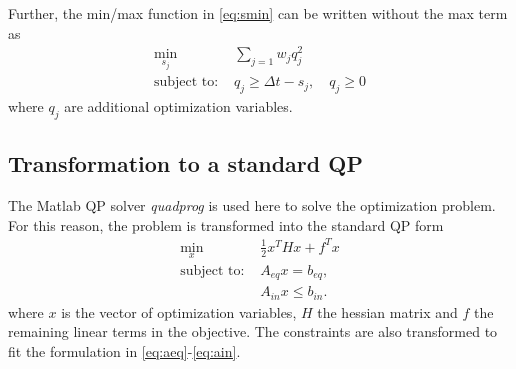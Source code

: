 \documentclass[letterpaper,10pt,conference]{ieeeconf}
\begin{document}
Further, the min/max function in \eqref{eq:smin} can be written without the max term as
\begin{subequations}\label{qdef}
\begin{align}\label{eq:qmin}
\min_{s_j}\;  &\sum_{j=1}  w_{j} q_j^2\\
\text{subject to: } & q_j \geq \Delta t - s_j, \quad q_j \geq 0
\end{align}
\end{subequations}
where $q_j$ are additional optimization variables.
\subsection{Transformation to a standard QP}
The Matlab QP solver \emph{quadprog} is used here to solve the optimization problem. For this reason, the problem is transformed into the standard QP form
\begin{subequations} \label{stform}
\begin{align}\label{eq:quad}
\min_{x}\; &\frac{1}{2}x^THx+f^Tx\\
\text{subject to: }
&A_{eq}x =b_{eq},\label{eq:aeq}\\
&A_{in}x \leq b_{in}.\label{eq:ain}
\end{align}
\end{subequations}
where $x$ is the vector of optimization variables, $H$ the hessian matrix and $f$ the remaining linear terms in the objective. The constraints are also transformed to fit the formulation in \eqref{eq:aeq}-\eqref{eq:ain}.
\end{document}
